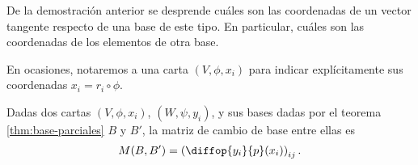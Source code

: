 De la demostración anterior se desprende cuáles son las coordenadas de un vector
tangente respecto de una base de este tipo. En particular, cuáles son las
coordenadas de los elementos de otra base.
\begin{notacion}
  En ocasiones, notaremos a una carta $(V,\phi,x_{i})$ para indicar
  explícitamente sus coordenadas $x_{i} = r_{i}\circ \phi$.
\end{notacion}
\begin{nprop}
  Dadas dos cartas $(V, \phi, x_{i})$, $(W,\psi,y_{i})$, y sus bases dadas por
  el teorema \ref{thm:base-parciales} $B$ y $B'$, la matriz de cambio de base
  entre ellas es
  \[
    M(B,B') = \left( \diffop{y_{i}}{p}(x_{i}) \right)_{ij}
  .\]
\end{nprop}